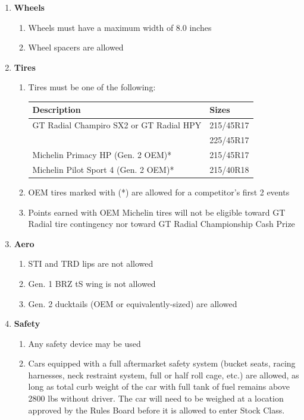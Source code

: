 \documentclass{article}
\newenvironment{legallist}{
    \begin{enumerate}[label*=\arabic*.]
}{
    \end{enumerate}
}
\begin{document}
\begin{legallist}
\begin{legallist}
				\item \textbf{Wheels}
				\begin{legallist}
					\item Wheels must have a maximum width of 8.0 inches
					\item Wheel spacers are allowed
				\end{legallist}
								
				\item \textbf{Tires}
				\begin{legallist}
					\item Tires must be one of the following:
										
					\begin{longtable}{p{8cm} l}
						\toprule
						\textbf{Description}                    & \textbf{Sizes} \\
						\midrule
						GT Radial Champiro SX2 or GT Radial HPY                 & 215/45R17      \\ 
						                                        & 225/45R17      \\
						\midrule
						Michelin Primacy HP (Gen. 2 OEM)*       & 215/45R17      \\
						\midrule
						Michelin Pilot Sport 4 (Gen. 2 OEM)*    & 215/40R18      \\
						\bottomrule
					\end{longtable}
										
					\item OEM tires marked with (*) are allowed for a competitor’s first 2 events
										
					\item Points earned with OEM Michelin tires will not be eligible toward GT Radial tire contingency nor toward GT Radial Championship Cash Prize
				\end{legallist}
								
				\item \textbf{Aero}
				\begin{legallist}
					\item STI and TRD lips are not allowed
					\item Gen. 1 BRZ tS wing is not allowed
					\item Gen. 2 ducktails (OEM or equivalently-sized) are allowed
				\end{legallist}
								
				\item \textbf{Safety}
				\begin{legallist}
					\item Any safety device may be used
					\item Cars equipped with a full aftermarket safety system (bucket seats, racing harnesses, neck restraint system, full or half roll cage, etc.) are allowed, as long as total curb weight of the car with full tank of fuel remains above 2800 lbs without driver. The car will need to be weighed at a location approved by the Rules Board before it is allowed to enter Stock Class.
				\end{legallist}
								

\end{legallist}
\end{legallist}
\end{document}
